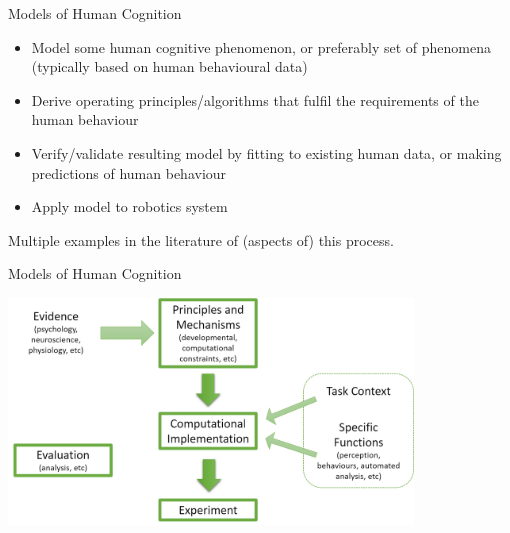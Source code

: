 \documentclass[compress]{beamer}
\begin{document}
\begin{frame}{Models of Human Cognition}    

    \begin{itemize}
        \item Model some human cognitive phenomenon, or preferably set of phenomena (typically based on human behavioural data)
        \item Derive operating principles/algorithms that fulfil the requirements of the human behaviour
        \item Verify/validate resulting model by fitting to existing human data, or making predictions of human behaviour
        \item Apply model to robotics system
    \end{itemize}
    
    Multiple examples in the literature of (aspects of) this process.

\end{frame}


\begin{frame}{Models of Human Cognition}    

    \includegraphics[height=60mm]{cogarch-cognitive-integration}

\end{frame}
\end{document}
